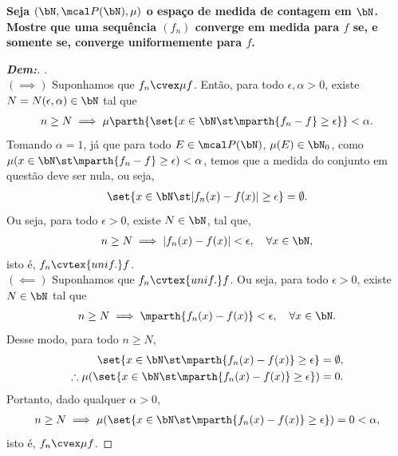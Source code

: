 \textbf{Seja $(\bN, \mcal P(\bN), \mu)$ o espaço de medida de contagem em $\bN$. 
Mostre que uma sequência $(f_n)$ converge em medida para $f$ se, e somente se, 
converge uniformemente para $f$.}
\begin{proof}[\textbf{Dem:}] .\\
  $(\implies)$ Suponhamos que $f_n \cvex \mu f$. Então, para todo $\epsilon,\alpha> 0$, 
  existe $N = N(\epsilon, \alpha) \in \bN$ tal que 
  \begin{align*}
    n \ge N \implies \mu\parth{\set{x \in \bN \st \mparth{f_n - f} \ge \epsilon}}<\alpha.
  \end{align*}
  Tomando $\alpha = 1$, já que para todo $E \in \mcal P (\bN)$, $\mu(E) \in \bN_0$,
  como $\mu(x \in \bN \st \mparth{f_n - f}\ge \epsilon) < \alpha$, temos que 
  a medida do conjunto em questão deve ser nula, ou seja,
  \begin{align*}
    \set{x \in \bN \st |f_n(x) - f(x)| \ge \epsilon} = \emptyset.
  \end{align*}
  Ou seja, para todo $\epsilon>0$, existe $N \in \bN$, tal que,
  \begin{align*}
    n \ge N \implies |f_n(x) - f(x)| < \epsilon, \quad \forall x \in \bN,
  \end{align*}
  isto é, $f_n \cvtex{unif.} f$.\\
  $(\impliedby)$ Suponhamos que $f_n \cvtex{unif.} f$. Ou seja, para todo $\epsilon>0$,
  existe $N \in \bN$ tal que 
  \begin{align*}
    n \ge N \implies \mparth{f_n(x) - f(x)}< \epsilon,\quad \forall x \in \bN.
  \end{align*}
  Desse modo, para todo $n \ge N$,
  \begin{align*}
    \set{x \in \bN \st \mparth{f_n(x) - f(x)}\ge \epsilon} &= \emptyset, \\
    \therefore\mu(\set{x \in \bN \st \mparth{f_n(x) - f(x)}\ge \epsilon}) &= 0.
  \end{align*}
  Portanto, dado qualquer $\alpha>0$, 
  \begin{align*}
    n \ge N \implies 
    \mu(\set{x \in \bN \st \mparth{f_n(x) - f(x)}\ge \epsilon}) = 0 <\alpha,
  \end{align*}
  isto é, $f_n \cvex \mu f$.
\end{proof}


